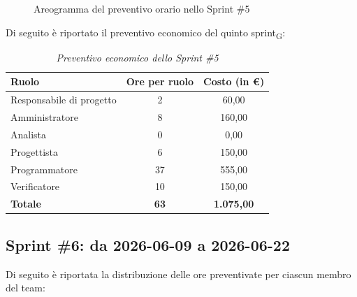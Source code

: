 ﻿\documentclass[a4paper, 10pt, colorlinks=true, linkcolor=black, urlcolor=blue, citecolor=blue, hidelinks]{article}
\renewcommand{\arraystretch}{1.2}
\begin{document}
\begin{figure}[H]

\caption{Areogramma del preventivo orario nello Sprint \#5}
\label{fig:preventivo-sprint5}
\end{figure}

Di seguito è riportato il preventivo economico del quinto sprint\textsubscript{G}:

\begin{table}[H]
    \centering
    \renewcommand{\arraystretch}{1.4}
    \begin{tabular}{|l|c|c|}
        \hline
        \rowcolor{bluBitless!15}
        \textbf{Ruolo} & \textbf{Ore per ruolo} & \textbf{Costo (in €)} \\
        \hline
        Responsabile di progetto & 2 & 60,00 \\ \hline
        Amministratore & 8 & 160,00 \\ \hline
        Analista & 0 & 0,00 \\ \hline
        Progettista & 6 & 150,00 \\ \hline
        Programmatore & 37 & 555,00 \\ \hline
        Verificatore & 10 & 150,00 \\ \hline
        \rowcolor{bluBitless!8}
        \textbf{Totale} & \textbf{63} & \textbf{1.075,00} \\ \hline
    \end{tabular}
    \caption{\textit{Preventivo economico dello Sprint \#5}}
\end{table}

\subsection{Sprint \#6: da 2026-06-09 a 2026-06-22}
Di seguito è riportata la distribuzione delle ore preventivate per ciascun membro del team:
\end{document}
